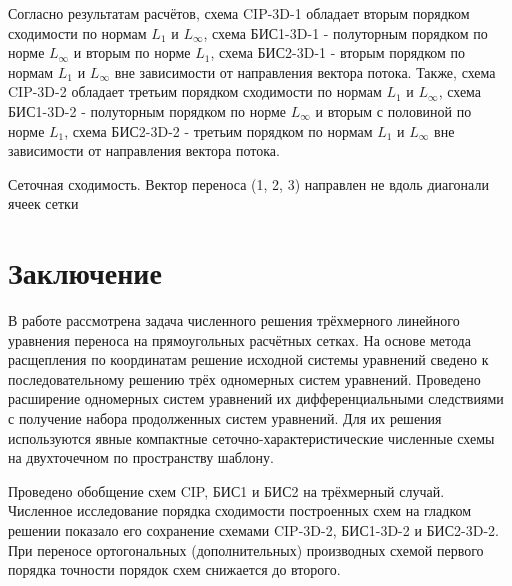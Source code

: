 \documentclass[11pt]{article}
\begin{document}
Согласно результатам расчётов, схема CIP-3D-1 обладает вторым порядком сходимости по нормам $L_1$ и $L_{\infty}$,
схема БИС1-3D-1 - полуторным порядком по норме $L_{\infty}$ и вторым по норме $L_1$, схема БИС2-3D-1 -
вторым порядком по нормам $L_1$ и $L_{\infty}$ вне зависимости от направления вектора потока.
Также, схема CIP-3D-2 обладает третьим порядком сходимости по нормам $L_1$ и $L_{\infty}$,
схема БИС1-3D-2 - полуторным порядком по норме $L_{\infty}$ и вторым с половиной по норме $L_1$, схема БИС2-3D-2 -
третьим порядком по нормам $L_1$ и $L_{\infty}$ вне зависимости от направления вектора потока.

\begin{table}
\caption {Сеточная сходимость. Вектор переноса (1, 2, 3) направлен не вдоль диагонали ячеек сетки} \label{tab_convergence_nondiagonal_3d}
\bigskip

\end{table}

\section{Заключение}

В работе рассмотрена задача численного решения трёхмерного линейного уравнения переноса на прямоугольных расчётных сетках.
На основе метода расщепления по координатам решение исходной системы уравнений сведено к последовательному решению
трёх одномерных систем уравнений.
Проведено расширение одномерных систем уравнений их дифференциальными следствиями с получение набора продолженных систем уравнений.
Для их решения используются явные компактные сеточно-характеристические численные схемы на двухточечном по пространству шаблону.

Проведено обобщение схем CIP, БИС1 и БИС2 на трёхмерный случай.
Численное исследование порядка сходимости построенных схем на гладком решении показало его сохранение схемами
CIP-3D-2, БИС1-3D-2 и БИС2-3D-2.
При переносе ортогональных (дополнительных) производных схемой первого порядка точности порядок схем снижается до второго.
\end{document}
